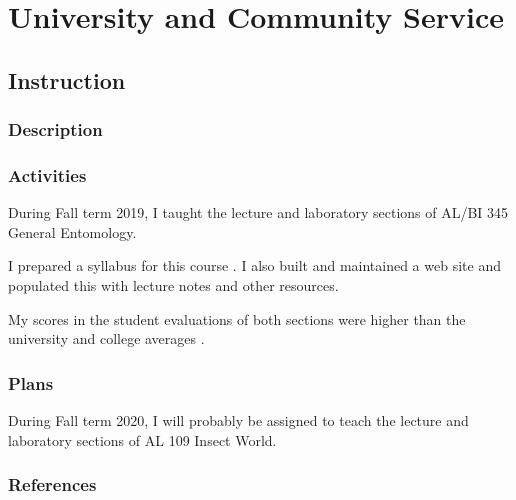 \pagebreak
\section{University and Community Service}

\subsection{Instruction}
\begin{refsection}
	
\subsubsection{Description}


\subsubsection{Activities}

During Fall term 2019, I taught the lecture and laboratory sections of AL/BI 345 General Entomology.

I prepared a syllabus for this course \cite{moore_syllabus_2019}. I also built and maintained a web site \cite{moore_web_2019-1} and populated this with lecture notes and other resources.

My scores in the student evaluations of both sections were higher than the university and college averages \cite{moore_student_2019}.

\subsubsection{Plans}

During Fall term 2020, I will probably be assigned to teach the lecture and laboratory sections of AL 109 Insect World.

\subsubsection{References}
\printbibliography[heading=none]
\end{refsection}

